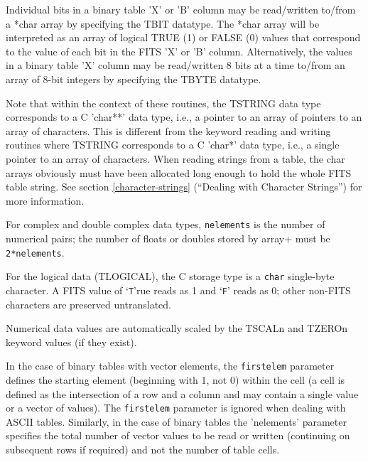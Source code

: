 \documentclass[11pt]{book}
\begin{document}
Individual bits in a binary table 'X' or 'B' column may be read/written
to/from a *char array by specifying the TBIT datatype.  The *char
array will be interpreted as an array of logical TRUE (1) or FALSE (0)
values that correspond to the value of each bit in the FITS 'X' or 'B' column.
Alternatively, the values in a binary table 'X' column may be read/written
8 bits at a time to/from an array of 8-bit integers by specifying the
TBYTE datatype.

Note that within the context of these routines, the TSTRING data type
corresponds to a C 'char**' data type, i.e., a pointer to an array of
pointers to an array of characters.  This is different from the keyword
reading and writing routines where TSTRING corresponds to a C 'char*'
data type, i.e., a single pointer to an array of characters.  When
reading strings from a table, the char arrays obviously must have been
allocated long enough to hold the whole FITS table string.
See section \ref{character-strings}
(``Dealing with Character Strings'') for more information.

For complex and double complex data types, \verb+nelements+ is the number
of numerical pairs; the number of floats or doubles stored by
\+array+ must be \verb+2*nelements+.

For the logical data (TLOGICAL), the C storage type is a \verb+char+
single-byte character.  A FITS value of `\verb+T+'rue reads as 1 and
`\verb+F+' reads as 0; other non-FITS characters are preserved untranslated.

Numerical data values are automatically scaled by the TSCALn and TZEROn
keyword values (if they exist).

In the case of binary tables with vector elements, the \verb+firstelem+
parameter defines the starting element (beginning with 1, not 0) within
the cell (a cell is defined as the intersection of a row and a column
and may contain a single value or a vector of values).  The \verb+firstelem+
parameter is ignored when dealing with ASCII tables. Similarly, in the
case of binary tables the 'nelements' parameter specifies the total
number of vector values to be read or written (continuing on subsequent
rows if required) and not the number of table cells.
\end{document}
